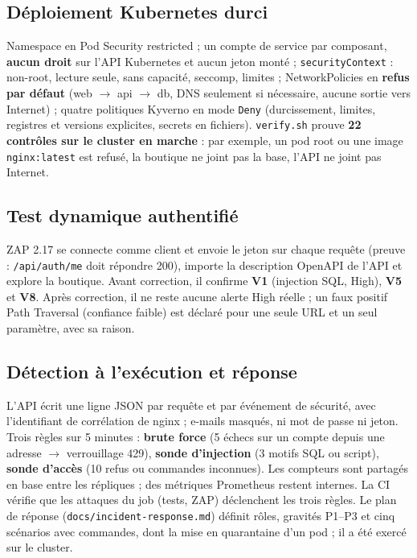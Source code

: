 \documentclass[11pt,a4paper]{article}
\newcommand{\code}[1]{\texttt{\small #1}}
\begin{document}
\subsection{Déploiement Kubernetes durci}
Namespace en Pod Security \og restricted \fg{} ; un compte de service par composant, \textbf{aucun droit} sur
l'API Kubernetes et aucun jeton monté ; \code{securityContext} : non-root, lecture seule, sans capacité,
seccomp, limites ; NetworkPolicies en \textbf{refus par défaut} (web $\rightarrow$ api $\rightarrow$ db,
DNS seulement si nécessaire, aucune sortie vers Internet) ; quatre politiques Kyverno en mode \code{Deny}
(durcissement, limites, registres et versions explicites, secrets en fichiers). \code{verify.sh} prouve
\textbf{22 contrôles sur le cluster en marche} : par exemple, un pod root ou une image \code{nginx:latest}
est refusé, la boutique ne joint pas la base, l'API ne joint pas Internet.

\subsection{Test dynamique authentifié}
ZAP 2.17 se connecte comme client et envoie le jeton sur chaque requête (preuve : \code{/api/auth/me} doit
répondre 200), importe la description OpenAPI de l'API et explore la boutique. Avant correction, il
confirme \textbf{V1} (injection SQL, High), \textbf{V5} et \textbf{V8}. Après correction, il ne reste
aucune alerte High réelle ; un faux positif \og Path Traversal \fg{} (confiance faible) est déclaré pour
une seule URL et un seul paramètre, avec sa raison.

\subsection{Détection à l'exécution et réponse}
L'API écrit une ligne JSON par requête et par événement de sécurité, avec l'identifiant de corrélation de
nginx ; e-mails masqués, ni mot de passe ni jeton. Trois règles sur 5 minutes : \textbf{brute force}
(5 échecs sur un compte depuis une adresse $\rightarrow$ verrouillage 429), \textbf{sonde d'injection}
(3 motifs SQL ou script), \textbf{sonde d'accès} (10 refus ou commandes inconnues). Les compteurs sont
partagés en base entre les répliques ; des métriques Prometheus restent internes. La CI vérifie que les
attaques du job (tests, ZAP) déclenchent les trois règles. Le plan de réponse
(\code{docs/incident-response.md}) définit rôles, gravités P1--P3 et cinq scénarios avec commandes, dont
la mise en quarantaine d'un pod ; il a été exercé sur le cluster.
\end{document}

